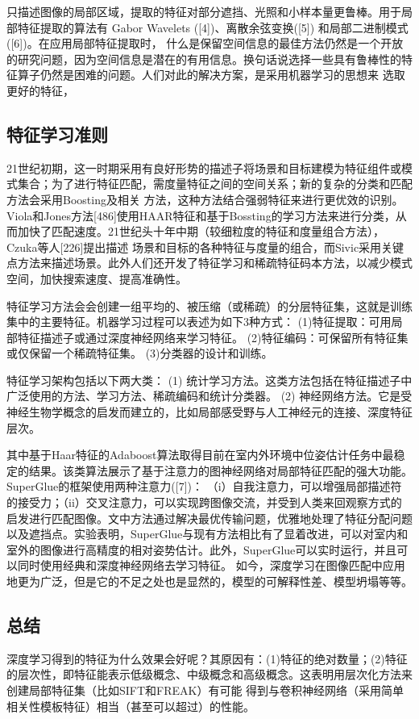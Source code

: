 只描述图像的局部区域，提取的特征对部分遮挡、光照和小样本量更鲁棒。用于局部特征提取的算法有 Gabor Wavelets ([4])、离散余弦变换([5]) 和局部二进制模式 ([6])。在应用局部特征提取时，
什么是保留空间信息的最佳方法仍然是一个开放的研究问题，因为空间信息是潜在的有用信息。换句话说选择一些具有鲁棒性的特征算子仍然是困难的问题。人们对此的解决方案，是采用机器学习的思想来
选取更好的特征，

\subsection{特征学习准则}

21世纪初期，这一时期采用有良好形势的描述子将场景和目标建模为特征组件或模式集合；为了进行特征匹配，需度量特征之间的空间关系；新的复杂的分类和匹配方法会采用Boosting及相关
方法，这种方法结合强弱特征来进行更优效的识别。Viola和Jones方法[486]使用HAAR特征和基于Bossting的学习方法来进行分类，从而加快了匹配速度。21世纪头十年中期（较细粒度的特征和度量组合方法），Czuka等人[226]提出描述
场景和目标的各种特征与度量的组合，而Sivic采用关键点方法来描述场景。此外人们还开发了特征学习和稀疏特征码本方法，以减少模式空间，加快搜索速度、提高准确性。

特征学习方法会会创建一组平均的、被压缩（或稀疏）的分层特征集，这就是训练集中的主要特征。机器学习过程可以表述为如下3种方式：
(1)特征提取：可用局部特征描述子或通过深度神经网络来学习特征。
(2)特征编码：可保留所有特征集或仅保留一个稀疏特征集。
(3)分类器的设计和训练。

特征学习架构包括以下两大类：
(1) 统计学习方法。这类方法包括在特征描述子中广泛使用的方法、学习方法、稀疏编码和统计分类器。
(2) 神经网络方法。它是受神经生物学概念的启发而建立的，比如局部感受野与人工神经元的连接、深度特征层次。

其中基于Haar特征的Adaboost算法取得目前在室内外环境中位姿估计任务中最稳定的结果。该类算法展示了基于注意力的图神经网络对局部特征匹配的强大功能。 SuperGlue的框架使用两种注意力([7])：
（i）自我注意力，可以增强局部描述符的接受力；（ii）交叉注意力，可以实现跨图像交流，并受到人类来回观察方式的启发进行匹配图像。文中方法通过解决最优传输问题，优雅地处理了特征分配问题
以及遮挡点。实验表明，SuperGlue与现有方法相比有了显着改进，可以对室内和室外的图像进行高精度的相对姿势估计。此外，SuperGlue可以实时运行，并且可以同时使用经典和深度神经网络去学习特征。
如今，深度学习在图像匹配中应用地更为广泛，但是它的不足之处也是显然的，模型的可解释性差、模型坍塌等等。

\subsection{总结}

深度学习得到的特征为什么效果会好呢？其原因有：(1)特征的绝对数量；(2)特征的层次性，即特征能表示低级概念、中级概念和高级概念。这表明用层次化方法来创建局部特征集（比如SIFT和FREAK）有可能
得到与卷积神经网络（采用简单相关性模板特征）相当（甚至可以超过）的性能。